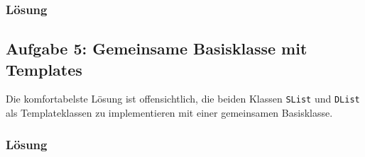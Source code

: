 \subsubsection{Lösung}


\noindent\makebox[\linewidth]{\rule{\paperwidth}{0.4pt}}

\noindent\makebox[\linewidth]{\rule{\paperwidth}{0.4pt}}

\noindent\makebox[\linewidth]{\rule{\paperwidth}{0.4pt}}

\noindent\makebox[\linewidth]{\rule{\paperwidth}{0.4pt}}

\noindent\makebox[\linewidth]{\rule{\paperwidth}{0.4pt}}


\subsection{Aufgabe 5: Gemeinsame Basisklasse mit Templates}

Die komfortabelste Lösung ist offensichtlich, die beiden Klassen \texttt{SList} und \texttt{DList} als Templateklassen zu implementieren mit einer gemeinsamen Basisklasse.

\subsubsection{Lösung}


\noindent\makebox[\linewidth]{\rule{\paperwidth}{0.4pt}}

\noindent\makebox[\linewidth]{\rule{\paperwidth}{0.4pt}}

\noindent\makebox[\linewidth]{\rule{\paperwidth}{0.4pt}}

